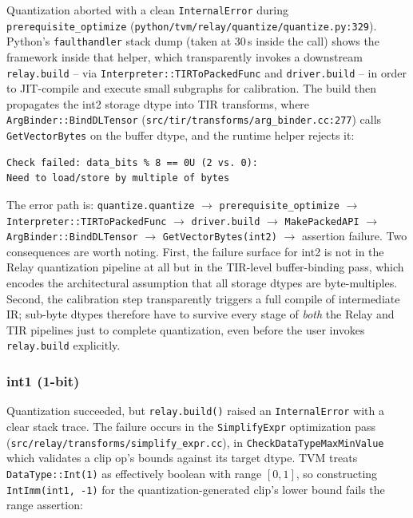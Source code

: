 \documentclass[11pt,a4paper]{article}
\begin{document}
Quantization aborted with a clean \texttt{InternalError} during \texttt{prerequisite\_optimize} (\texttt{python/tvm/relay/\allowbreak quantize/\allowbreak quantize.py:329}). Python's \texttt{faulthandler} stack dump (taken at 30\,s inside the call) shows the framework inside that helper, which transparently invokes a downstream \texttt{relay.build} -- via \texttt{Interpreter::TIRToPackedFunc} and \texttt{driver.build} -- in order to JIT-compile and execute small subgraphs for calibration. The build then propagates the int2 storage dtype into TIR transforms, where \texttt{ArgBinder::\allowbreak BindDLTensor} (\texttt{src/tir/transforms/\allowbreak arg\_binder.cc:277}) calls \texttt{GetVectorBytes} on the buffer dtype, and the runtime helper rejects it:
\begin{lstlisting}
Check failed: data_bits % 8 == 0U (2 vs. 0):
Need to load/store by multiple of bytes
\end{lstlisting}
The error path is: \texttt{quantize.quantize} $\rightarrow$ \texttt{prerequisite\_optimize} $\rightarrow$ \texttt{Interpreter::\allowbreak TIRToPackedFunc} $\rightarrow$ \texttt{driver.build} $\rightarrow$ \texttt{MakePackedAPI} $\rightarrow$ \texttt{ArgBinder::BindDLTensor} $\rightarrow$ \texttt{GetVectorBytes(int2)} $\rightarrow$ assertion failure. Two consequences are worth noting. First, the failure surface for int2 is not in the Relay quantization pipeline at all but in the TIR-level buffer-binding pass, which encodes the architectural assumption that all storage dtypes are byte-multiples. Second, the calibration step transparently triggers a full compile of intermediate IR; sub-byte dtypes therefore have to survive every stage of \emph{both} the Relay and TIR pipelines just to complete quantization, even before the user invokes \texttt{relay.build} explicitly.

\subsubsection{int1 (1-bit)}

Quantization succeeded, but \texttt{relay.build()} raised an \texttt{InternalError} with a clear stack trace. The failure occurs in the \texttt{SimplifyExpr} optimization pass (\texttt{src/relay/transforms/\allowbreak simplify\_expr.cc}), in \texttt{CheckDataTypeMaxMinValue} which validates a clip op's bounds against its target dtype. TVM treats \texttt{DataType::Int(1)} as effectively boolean with range $[0, 1]$, so constructing \texttt{IntImm(int1, -1)} for the quantization-generated clip's lower bound fails the range assertion:
\end{document}
